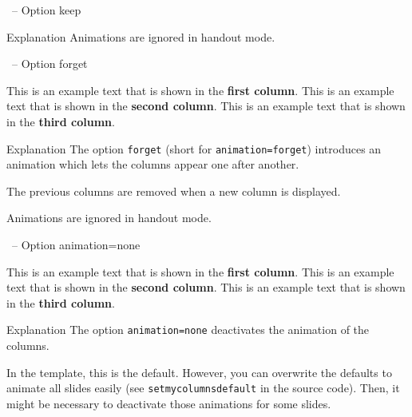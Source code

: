 \documentclass[
	aspectratio=169, %
	8pt, %
]{beamer}
\begin{document}
{\begin{frame}{\insertsubsection\ -- Option keep}
\begin{note}{Explanation}
		Animations are ignored in handout mode.
	\end{note}
\end{frame}

\begin{frame}{\insertsubsection\ -- Option forget}
	\begin{mycolumns}[columns=3,forget] %
		This is an example text that is shown in the \textbf{first column}.
	\mynextcolumn
		This is an example text that is shown in the \textbf{second column}.
	\mynextcolumn
		This is an example text that is shown in the \textbf{third column}.
	\end{mycolumns}
	\vfill
	\begin{note}{Explanation}
		The option \texttt{forget} (short for \texttt{animation=forget}) introduces an animation which lets the columns appear one after another.

		The previous columns are removed when a new column is displayed.

		Animations are ignored in handout mode.
	\end{note}
\end{frame}

\begin{frame}{\insertsubsection\ -- Option animation=none}
	\begin{mycolumns}[columns=3,animation=none]
		This is an example text that is shown in the \textbf{first column}.
	\mynextcolumn
		This is an example text that is shown in the \textbf{second column}.
	\mynextcolumn
		This is an example text that is shown in the \textbf{third column}.
	\end{mycolumns}
	\vfill
	\begin{note}{Explanation}
		The option \texttt{animation=none} deactivates the animation of the columns.

		In the template, this is the default. However, you can overwrite the defaults to animate all slides easily (see \texttt{setmycolumnsdefault} in the source code). Then, it might be necessary to deactivate those animations for some slides.
	\end{note}
\end{frame}

}
\end{document}
